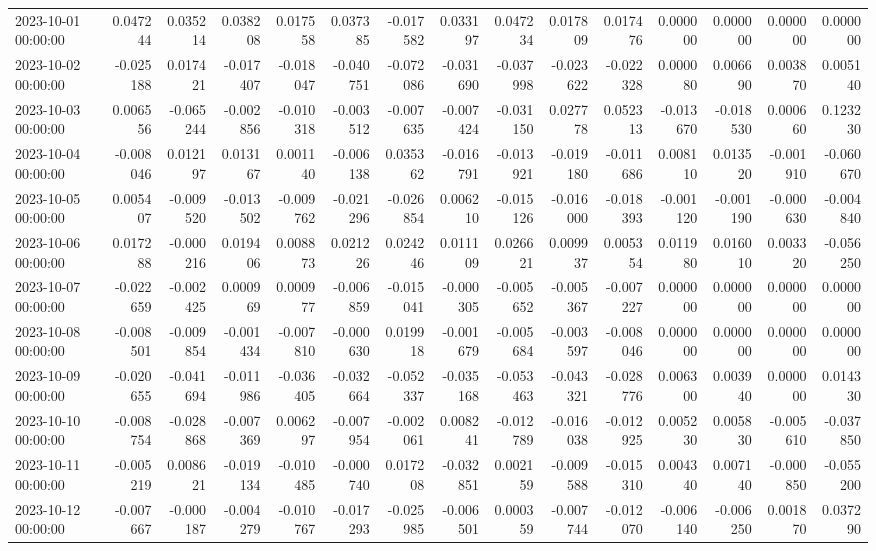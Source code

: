 \begin{tabular}{lrrrrrrrrrrrrrr}
2023-10-01 00:00:00 & 0.047244 & 0.035214 & 0.038208 & 0.017558 & 0.037385 & -0.017582 & 0.033197 & 0.047234 & 0.017809 & 0.017476 & 0.000000 & 0.000000 & 0.000000 & 0.000000 \\
2023-10-02 00:00:00 & -0.025188 & 0.017421 & -0.017407 & -0.018047 & -0.040751 & -0.072086 & -0.031690 & -0.037998 & -0.023622 & -0.022328 & 0.000080 & 0.006690 & 0.003870 & 0.005140 \\
2023-10-03 00:00:00 & 0.006556 & -0.065244 & -0.002856 & -0.010318 & -0.003512 & -0.007635 & -0.007424 & -0.031150 & 0.027778 & 0.052313 & -0.013670 & -0.018530 & 0.000660 & 0.123230 \\
2023-10-04 00:00:00 & -0.008046 & 0.012197 & 0.013167 & 0.001140 & -0.006138 & 0.035362 & -0.016791 & -0.013921 & -0.019180 & -0.011686 & 0.008110 & 0.013520 & -0.001910 & -0.060670 \\
2023-10-05 00:00:00 & 0.005407 & -0.009520 & -0.013502 & -0.009762 & -0.021296 & -0.026854 & 0.006210 & -0.015126 & -0.016000 & -0.018393 & -0.001120 & -0.001190 & -0.000630 & -0.004840 \\
2023-10-06 00:00:00 & 0.017288 & -0.000216 & 0.019406 & 0.008873 & 0.021226 & 0.024246 & 0.011109 & 0.026621 & 0.009937 & 0.005354 & 0.011980 & 0.016010 & 0.003320 & -0.056250 \\
2023-10-07 00:00:00 & -0.022659 & -0.002425 & 0.000969 & 0.000977 & -0.006859 & -0.015041 & -0.000305 & -0.005652 & -0.005367 & -0.007227 & 0.000000 & 0.000000 & 0.000000 & 0.000000 \\
2023-10-08 00:00:00 & -0.008501 & -0.009854 & -0.001434 & -0.007810 & -0.000630 & 0.019918 & -0.001679 & -0.005684 & -0.003597 & -0.008046 & 0.000000 & 0.000000 & 0.000000 & 0.000000 \\
2023-10-09 00:00:00 & -0.020655 & -0.041694 & -0.011986 & -0.036405 & -0.032664 & -0.052337 & -0.035168 & -0.053463 & -0.043321 & -0.028776 & 0.006300 & 0.003940 & 0.000000 & 0.014330 \\
2023-10-10 00:00:00 & -0.008754 & -0.028868 & -0.007369 & 0.006297 & -0.007954 & -0.002061 & 0.008241 & -0.012789 & -0.016038 & -0.012925 & 0.005230 & 0.005830 & -0.005610 & -0.037850 \\
2023-10-11 00:00:00 & -0.005219 & 0.008621 & -0.019134 & -0.010485 & -0.000740 & 0.017208 & -0.032851 & 0.002159 & -0.009588 & -0.015310 & 0.004340 & 0.007140 & -0.000850 & -0.055200 \\
2023-10-12 00:00:00 & -0.007667 & -0.000187 & -0.004279 & -0.010767 & -0.017293 & -0.025985 & -0.006501 & 0.000359 & -0.007744 & -0.012070 & -0.006140 & -0.006250 & 0.001870 & 0.037290 \\

\end{tabular}
